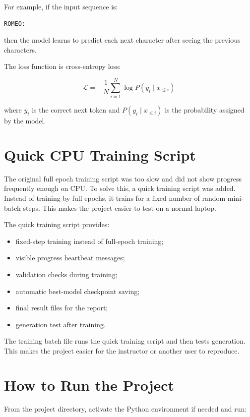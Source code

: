 \documentclass[11pt]{article}
\begin{document}
For example, if the input sequence is:

\begin{lstlisting}
ROMEO:
\end{lstlisting}

then the model learns to predict each next character after seeing the previous characters.

The loss function is cross-entropy loss:

\[
    \mathcal{L} = - \frac{1}{N}\sum_{i=1}^{N} \log P(y_i \mid x_{\leq i})
\]

where \(y_i\) is the correct next token and \(P(y_i \mid x_{\leq i})\) is the probability assigned by the model.

\section{Quick CPU Training Script}

The original full epoch training script was too slow and did not show progress frequently enough on CPU. To solve this, a quick training script was added. Instead of training by full epochs, it trains for a fixed number of random mini-batch steps. This makes the project easier to test on a normal laptop.

The quick training script provides:

\begin{itemize}[leftmargin=*]
    \item fixed-step training instead of full-epoch training;
    \item visible progress heartbeat messages;
    \item validation checks during training;
    \item automatic best-model checkpoint saving;
    \item final result files for the report;
    \item generation test after training.
\end{itemize}

The training batch file runs the quick training script and then tests generation. This makes the project easier for the instructor or another user to reproduce.

\section{How to Run the Project}

From the project directory, activate the Python environment if needed and run:
\end{document}
